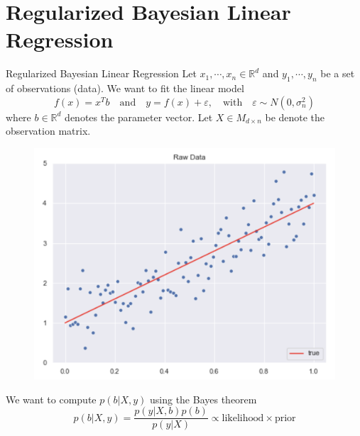 \documentclass[10pt]{beamer}
\begin{document}
\section{Regularized Bayesian Linear Regression}

\begin{frame}{Regularized Bayesian Linear Regression}
Let $x_1, \cdots, x_n \in \mathbb{R}^d$ and $y_1, \cdots, y_n$ be a set of observations (data). We want to fit the linear model 
$$
f(x) = x^T b \quad \text{and} \quad y = f(x) + \varepsilon, \quad \text{with} \quad \varepsilon \sim N(0, \sigma_n^2)
$$
where $b \in \mathbb{R}^d$ denotes the parameter vector. Let $X \in M_{d \times n}$ be denote the observation matrix. 
\begin{center}
\begin{figure}
\includegraphics[scale=0.15]{images/lin_raw_data.png} 
\end{figure}
\end{center}
We want to compute $p(b|X, y)$ using the Bayes theorem 
$$
p(b|X, y) = \frac{p(y|X, b) p(b)}{p(y|X) } \propto \text{likelihood} \times \text{prior}
$$
\end{frame}
\end{document}
